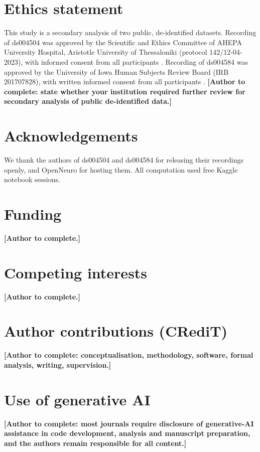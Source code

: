 \section*{Ethics statement}
This study is a secondary analysis of two public, de-identified datasets. Recording of ds004504 was
approved by the Scientific and Ethics Committee of AHEPA University Hospital, Aristotle University of
Thessaloniki (protocol 142/12-04-2023), with informed consent from all participants \cite{F1}. Recording of
ds004584 was approved by the University of Iowa Human Subjects Review Board (IRB 201707828), with written
informed consent from all participants \cite{ds004584src}. \textbf{[Author to complete: state whether your
institution required further review for secondary analysis of public de-identified data.]}

\section*{Acknowledgements}
We thank the authors of ds004504 and ds004584 for releasing their recordings openly, and OpenNeuro for
hosting them. All computation used free Kaggle notebook sessions.

\section*{Funding}
\textbf{[Author to complete.]}

\section*{Competing interests}
\textbf{[Author to complete.]}

\section*{Author contributions (CRediT)}
\textbf{[Author to complete: conceptualisation, methodology, software, formal analysis, writing, supervision.]}

\section*{Use of generative AI}
\textbf{[Author to complete: most journals require disclosure of generative-AI assistance in code
development, analysis and manuscript preparation, and the authors remain responsible for all content.]}
